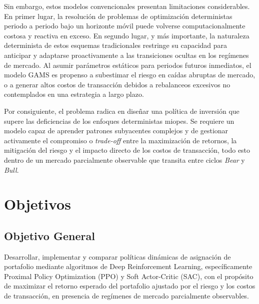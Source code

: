 Sin embargo, estos modelos convencionales presentan limitaciones considerables. En primer lugar, la resolución de problemas de optimización deterministas periodo a periodo bajo un horizonte móvil puede volverse computacionalmente costosa y reactiva en exceso. En segundo lugar, y más importante, la naturaleza determinista de estos esquemas tradicionales restringe su capacidad para anticipar y adaptarse proactivamente a las transiciones ocultas en los regímenes de mercado. Al asumir parámetros estáticos para periodos futuros inmediatos, el modelo GAMS es propenso a subestimar el riesgo en caídas abruptas de mercado, o a generar altos costos de transacción debidos a rebalanceos excesivos no contemplados en una estrategia a largo plazo.

Por consiguiente, el problema radica en diseñar una política de inversión que supere las deficiencias de los enfoques deterministas miopes. Se requiere un modelo capaz de aprender patrones subyacentes complejos y de gestionar activamente el compromiso o \textit{trade-off} entre la maximización de retornos, la mitigación del riesgo y el impacto directo de los costos de transacción, todo esto dentro de un mercado parcialmente observable que transita entre ciclos \textit{Bear} y \textit{Bull}.

\section{Objetivos}

\subsection{Objetivo General}
Desarrollar, implementar y comparar políticas dinámicas de asignación de portafolio mediante algoritmos de Deep Reinforcement Learning, específicamente Proximal Policy Optimization (PPO) y Soft Actor-Critic (SAC), con el propósito de maximizar el retorno esperado del portafolio ajustado por el riesgo y los costos de transacción, en presencia de regímenes de mercado parcialmente observables.

